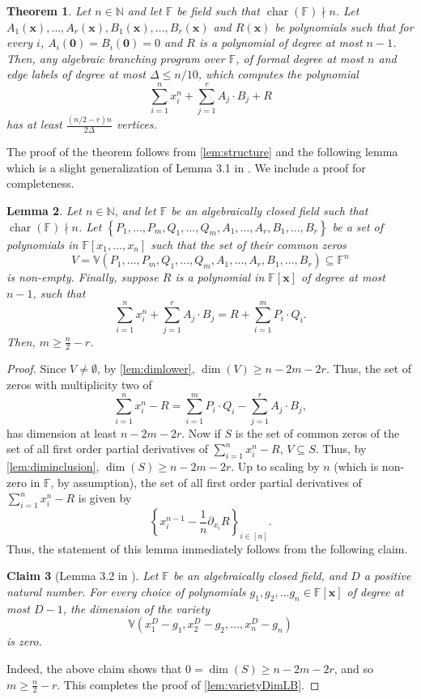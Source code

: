 \documentclass[10pt,a4paper]{article}
\newtheorem{theorem}{Theorem}
\newtheorem{lemma}[theorem]{Lemma}
\newtheorem{claim}[theorem]{Claim}
\newcommand{\F}{\mathbb F}
\newcommand{\N}{\mathbb N}
\newcommand{\vx}{\mathbf x}
\DeclareMathOperator{\Char}{char}
\newcommand{\set}[1]{\left\{#1\right\}}
\begin{document}
\begin{theorem}\label{thm:robustHomog}
	Let $n \in \N$ and let $\F$ be field such that $\Char(\F) \nmid n$.
	Let $A_1(\vx), \ldots, A_r(\vx), B_1(\vx),  \ldots, B_r(\vx)$ and $R(\vx)$ be polynomials such that for every $i$, $A_i(\mathbf{0}) = B_i(\mathbf{0}) = 0$ and $R$ is a polynomial of degree at most $n-1$. Then, any algebraic branching program over $\F$, of formal degree at most $n$ and edge labels of degree at most $\Delta \le n/10$, which computes the polynomial 
	\[\sum_{i = 1}^n x_i^n + \sum_{j = 1}^r A_j\cdot B_j + R\]
	has at least $\frac{(n/2-r)n}{2\Delta}$ vertices. 
\end{theorem}
	

The proof of the theorem follows from \autoref{lem:structure} and the following lemma which is a slight generalization of  Lemma 3.1 in \cite{K19}. We include a proof for completeness. 


\sloppy
\begin{lemma}\label{lem:varietyDimLB}
	Let $n \in \N$, and let $\F$ be an algebraically closed field such that $\Char(\F) \nmid n$. Let $\set{P_1, \ldots, P_m, Q_1, \ldots, Q_m, A_1, \ldots, A_r, B_1, \ldots, B_r}$ be a set of polynomials in $\F[x_1, \ldots, x_n]$ such that the set of their common zeros 
	\[
		V = \mathbb{V}(P_1, \ldots, P_m, Q_1, \ldots, Q_m, A_1, \ldots, A_r, B_1, \ldots, B_r) \subseteq \F^n
	\]
	is non-empty. Finally, suppose $R$ is a polynomial in $\F[\vx]$ of degree at most $n-1$, such that
	\[
		\sum_{i=1}^{n} x_i^n + \sum_{j=1}^{r} A_j \cdot B_j = R + \sum_{i=1}^{m} P_i \cdot Q_i.
	\]
	Then, $m \geq \frac{n}{2} - r$.
\end{lemma}
		
\begin{proof}
	Since $V\neq\emptyset$, by \autoref{lem:dimlower}, $\dim(V)\ge n-2m-2r$.  Thus, the set of zeros with multiplicity two of 
	\[
		\sum_{i=1}^{n} x_i^n - R = \sum_{i=1}^{m} P_i \cdot Q_i - \sum_{j=1}^{r} A_j \cdot B_j, 
	\]
	has dimension at least $n - 2m - 2r$. Now if $S$ is the set of common zeros of the set of all first order partial derivatives of $\sum_{i=1}^n x_i^n-R$, $V\subseteq S$. Thus, by \autoref{lem:diminclusion}, $\dim(S)\ge n-2m-2r$. Up to scaling by $n$ (which is non-zero in $\F$, by assumption), the set of all first order partial derivatives of $\sum_{i=1}^{n} x_i^n - R$ is given by 
	\[
		\set{x_i^{n-1} - \frac{1}{n}\partial_{x_i}R}_{i \in [n]}.
	\]
	Thus, the statement of this lemma immediately follows from the following claim.
			
	\begin{claim}[Lemma 3.2 in \cite{K19}]
		Let $\F$ be an algebraically closed field, and $D$ a positive natural number. For every choice of polynomials $g_1, g_2, \ldots g_n \in \F[\vx]$ of degree at most $D-1$, the dimension of the variety 
		\[\mathbb{V}(x_1^D - g_1, x_2^D - g_2, \ldots, x_n^D - g_n)\] is zero.
	\end{claim}
	Indeed, the above claim shows that $0 = \dim(S) \geq n-2m-2r$, and so $m \geq \frac{n}{2} - r$. This completes the proof of \autoref{lem:varietyDimLB}.
\end{proof}
\end{document}

